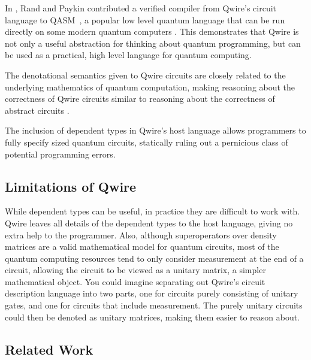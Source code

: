In \citet{qwirepractice}, Rand and Paykin contributed a verified compiler from Qwire's circuit language to QASM~\cite{qasm}, a popular low level quantum language that can be run directly on some modern quantum computers .
This demonstrates that Qwire is not only a useful abstraction for thinking about quantum programming, but can be used as a practical, high level language for quantum computing.

The denotational semantics given to Qwire circuits are closely related to the underlying mathematics of quantum computation, making reasoning about the correctness of Qwire circuits similar to reasoning about the correctness of abstract circuits .

The inclusion of dependent types in Qwire's host language allows programmers to fully specify sized quantum circuits, statically ruling out a pernicious class of potential programming errors.

\subsection{Limitations of Qwire}

While dependent types can be useful, in practice they are difficult to work with.
Qwire leaves all details of the dependent types to the host language, giving no extra help to the programmer.
Also, although superoperators over density matrices are a valid mathematical model for quantum circuits, most of the quantum computing resources tend to only consider measurement at the end of a circuit, allowing the circuit to be viewed as a unitary matrix, a simpler mathematical object.
You could imagine separating out Qwire's circuit description language into two parts, one for circuits purely consisting of unitary gates, and one for circuits that include measurement.
The purely unitary circuits could then be denoted as unitary matrices, making them easier to reason about.

\subsection{Related Work}

